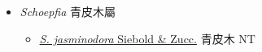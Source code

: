 
  \begin{itemize}
 \item[] \textit{Schoepfia} 青皮木屬
                    
  \begin{itemize}
        \item[] \href{http://www.theplantlist.org/tpl1.1/search?q=Schoepfia+jasminodora}{\textit{S. jasminodora} Siebold \& Zucc.}   青皮木 NT
  \end{itemize}
  \end{itemize}
